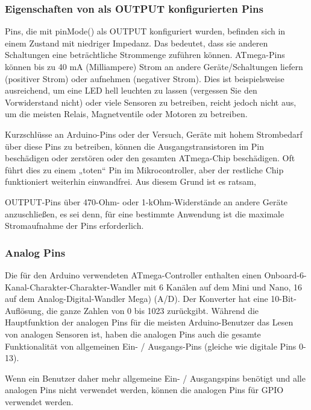 
\subsubsection{Eigenschaften von als OUTPUT konfigurierten Pins}

Pins, die mit pinMode() als OUTPUT konfiguriert wurden, befinden sich in einem Zustand mit niedriger Impedanz. Das bedeutet, dass sie anderen Schaltungen eine beträchtliche Strommenge zuführen können. ATmega-Pins können bis zu 40 mA (Milliampere) Strom an andere Geräte/Schaltungen liefern (positiver Strom) oder aufnehmen (negativer Strom). Dies ist beispielsweise ausreichend, um eine LED hell leuchten zu lassen (vergessen Sie den Vorwiderstand nicht) oder viele Sensoren zu betreiben, reicht jedoch nicht aus, um die meisten Relais, Magnetventile oder Motoren zu betreiben.

Kurzschlüsse an Arduino-Pins oder der Versuch, Geräte mit hohem Strombedarf über diese Pins zu betreiben, können die Ausgangstransistoren im Pin beschädigen oder zerstören oder den gesamten ATmega-Chip beschädigen. Oft führt dies zu einem „toten“ Pin im Mikrocontroller, aber der restliche Chip funktioniert weiterhin einwandfrei. Aus diesem Grund ist es ratsam,

OUTPUT-Pins über 470-Ohm- oder 1-kOhm-Widerstände an andere Geräte anzuschließen, es sei denn, für eine bestimmte Anwendung ist die maximale Stromaufnahme der Pins erforderlich.\cite{ArduinoPins:2026b}


\subsubsection{Analog Pins}

Die für den Arduino verwendeten ATmega-Controller enthalten einen 
Onboard-6-Kanal-Charakter-Charakter-Wandler mit 6 Kanälen auf dem Mini und Nano, 16 auf dem Analog-Digital-Wandler Mega) (A/D). Der Konverter hat eine 10-Bit-Auflösung, die ganze Zahlen von 0 bis 1023 zurückgibt. Während die Hauptfunktion der analogen Pins für die meisten Arduino-Benutzer das Lesen von analogen Sensoren ist, haben die analogen Pins auch die gesamte Funktionalität von allgemeinen Ein- / Ausgangs-Pins (gleiche wie digitale Pins 0-13).

Wenn ein Benutzer daher mehr allgemeine Ein- / Ausgangspins benötigt und alle analogen Pins nicht verwendet werden, können die analogen Pins für GPIO verwendet werden.
\cite{ArduinoPins:2026a}


